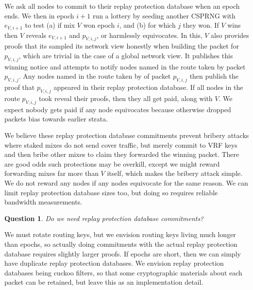 ﻿\documentclass{sig-alternate-hotpets}
\newtheorem{question}{Question}
\begin{document}
We ask all nodes to commit to their replay protection database when an epoch ends.  We then in epoch $i+1$ run a lottery by seeding another CSPRNG with $e_{V,i+1}$ to test (a) if mix $V$ won epoch $i$, and (b) for which $j$ they won.  If $V$ wins then $V$ reveals $e_{V,i+1}$ and $p_{V,i,j}$, or harmlessly equivocates.  In this, $V$ also provides proofs that its sampled its network view honestly when building the packet for $p_{V,i,j}$, which are trivial in the case of a global network view.  It publishes this winning notice and attempts to notify nodes named in the route taken by packet $p_{V,i,j}$.  Any nodes named in the route taken by of packet $p_{V,i,j}$ then publish the proof that $p_{V,i,j}$ appeared in their replay protection database.  If all nodes in the route $p_{V,i,j}$ took reveal their proofs, then they all get paid, along with $V$.  We expect nobody gets paid if any node equivocates because otherwise dropped packets bias towards earlier strata.

We believe these replay protection database commitments prevent bribery attacks where staked mixes do not send cover traffic, but merely commit to VRF keys and then bribe other mixes to claim they forwarded the winning packet.  There are good odds such protections may be overkill, except we might reward forwarding mixes far more than $V$ itself, which makes the bribery attack simple.  We do not reward any nodes if any nodes equivocate for the same reason.  We can limit replay protection database sizes too, but doing so requires reliable bandwidth measurements.

\begin{question}
Do we need replay protection database commitments?
\end{question}

We must rotate routing keys, but we envision routing keys living much longer than epochs, so actually doing commitments with the actual replay protection database requires slightly larger proofs.  If epochs are short, then we can simply have duplicate replay protection databases.  We envision replay protection databases being cuckoo filters, so that some cryptographic materials about each packet can be retained, but leave this as an implementation detail.

\end{document}
